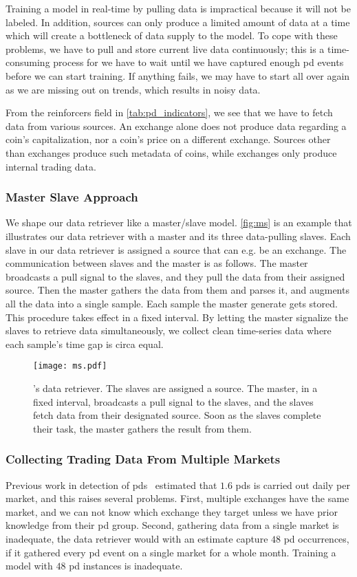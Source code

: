 Training a model in real-time by pulling data is impractical because it will not be labeled. In addition, sources can only produce a limited amount of data at a time which will create a bottleneck of data supply to the model. To cope with these problems, we have to pull and store current live data continuously; this is a time-consuming process for we have to wait until we have captured enough \ac{pd} events before we can start training. If anything fails, we may have to start all over again as we are missing out on trends, which results in noisy data.

From the reinforcers field in \autoref{tab:pd_indicators}, we see that we have to fetch data from various sources. An exchange alone does not produce data regarding a coin's capitalization, nor a coin's price on a different exchange. Sources other than exchanges produce such metadata of coins, while exchanges only produce internal trading data.

\subsubsection{Master Slave Approach}
We shape our data retriever like a master/slave model. \autoref{fig:ms} is an example that illustrates our data retriever with a master and its three data-pulling slaves. Each slave in our data retriever is assigned a source that can e.g. be an exchange. The communication between slaves and the master is as follows. The master broadcasts a pull signal to the slaves, and they pull the data from their assigned source. Then the master gathers the data from them and parses it, and augments all the data into a single sample. Each sample the master generate gets stored. This procedure takes effect in a fixed interval. By letting the master signalize the slaves to retrieve data simultaneously, we collect clean time-series data where each sample's time gap is circa equal. 

\begin{figure}[hbt!]
    \centering
    \texttt{[image: ms.pdf]}
    \caption[\project's data retriever]{\project's data retriever. The slaves are assigned a source. The master, in a fixed interval, broadcasts a pull signal to the slaves, and the slaves fetch data from their designated source. Soon as the slaves complete their task, the master gathers the result from them.}
    \label{fig:ms}
\end{figure}

\subsubsection{Collecting Trading Data From Multiple Markets}
Previous work in detection of \acp{pd}~\cite{P&D_to_the_moon} estimated that $1.6$ \acp{pd} is carried out daily per market, and this raises several problems. First, multiple exchanges have the same market, and we can not know which exchange they target unless we have prior knowledge from their \ac{pd} group. Second, gathering data from a single market is inadequate, the data retriever would with an estimate capture $48$ \ac{pd} occurrences, if it gathered every \ac{pd} event on a single market for a whole month. Training a model with $48$ \ac{pd} instances is inadequate. 

